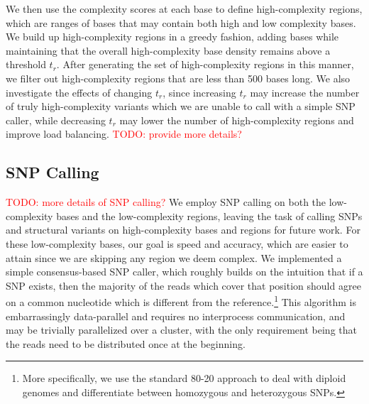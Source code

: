 \documentclass[10pt]{article}
\newcommand\TODO[1]{\textcolor{red}{TODO: #1}}
\begin{document}
We then use the complexity scores at each base to define high-complexity regions, which are ranges of bases that may contain both high and low complexity bases.
We build up high-complexity regions in a greedy fashion, adding bases while maintaining that the overall high-complexity base density remains above a threshold $t_r$.
After generating the set of high-complexity regions in this manner, we filter out high-complexity regions that are less than 500 bases long.
We also investigate the effects of changing $t_r$, since increasing $t_r$ may increase the number of truly high-complexity variants which we are unable to call with a simple SNP caller, while decreasing $t_r$ may lower the number of high-complexity regions and improve load balancing.
\TODO{provide more details?}

\subsection{SNP Calling}

\TODO{more details of SNP calling?}
We employ SNP calling on both the low-complexity bases and the low-complexity regions, leaving the task of calling SNPs and structural variants on high-complexity bases and regions for future work.
For these low-complexity bases, our goal is speed and accuracy, which are easier to attain since we are skipping any region we deem complex.
We implemented a simple consensus-based SNP caller, which roughly builds on the intuition that if a SNP exists, then the majority of the reads which cover that position should agree on a common nucleotide which is different from the reference.\footnote{More specifically, we use the standard 80-20 approach \cite{gatk} to deal with diploid genomes and differentiate between homozygous and heterozygous SNPs.}
This algorithm is embarrassingly data-parallel and requires no interprocess communication, and may be trivially parallelized over a cluster, with the only requirement being that the reads need to be distributed once at the beginning.
\end{document}
